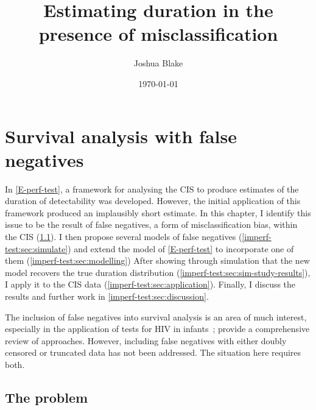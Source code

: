 \documentclass[thesis.tex]{subfiles}
\title{Estimating duration in the presence of misclassification}
\author{Joshua Blake}
\date{\today}
\begin{document}
\ifSubfilesClassLoaded{
  \setcounter{chapter}{5}
}

\chapter{Survival analysis with false negatives} \label{imperf-test}

In \cref{E-perf-test}, a framework for analysing the CIS to produce estimates of the duration of detectability was developed.
However, the initial application of this framework produced an implausibly short estimate.
In this chapter, I identify this issue to be the result of false negatives, a form of misclassification bias, within the CIS (\cref{imperf-test:sec:problem}).
I then propose several models of false negatives (\cref{imperf-test:sec:simulate}) and extend the model of \cref{E-perf-test} to incorporate one of them (\cref{imperf-test:sec:modelling})
After showing through simulation that the new model recovers the true duration distribution (\cref{imperf-test:sec:sim-study-results}), I apply it to the CIS data (\cref{imperf-test:sec:application}).
Finally, I discuss the results and further work in \cref{imperf-test:sec:discussion}.

The inclusion of false negatives into survival analysis is an area of much interest, especially in the application of tests for HIV in infants~\autocite[e.g.][]{brownBayesian,balasubramanianEstimation};
\textcite{piresIntervalMisclassify} provide a comprehensive review of approaches.
However, including false negatives with either doubly censored or truncated data has not been addressed.
The situation here requires both.



\section{The problem} \label{imperf-test:sec:problem}
\end{document}
